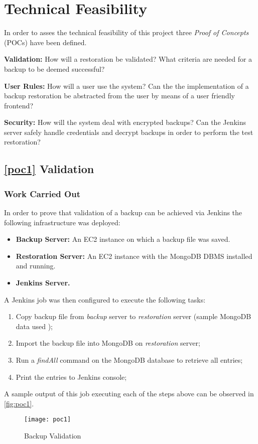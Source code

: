 
\section{Technical Feasibility}
In order to asses the technical feasibility of this project three \textit{Proof of Concepts} (POCs) have been defined.

\begin{POC}
	\item \label{poc1} \textbf{Validation:} How will a restoration be validated? What criteria are needed for a backup to be deemed successful?
	\item \label{poc2} \textbf{User Rules:} How will a user use the system? Can the the implementation of a backup restoration be abstracted from the user by means of a user friendly frontend?
	\item \label{poc3} \textbf{Security:} How will the system deal with encrypted backups? Can the Jenkins server safely handle credentials and decrypt backups in order to perform the test restoration?
\end{POC}

	\subsection{\ref{poc1} Validation}
	\subsubsection{Work Carried Out}	
	In order to prove that validation of a backup can be achieved via Jenkins the following infrastructure was deployed:
	\begin{itemize}
		\item \textbf{Backup Server:} An EC2 instance on which a backup file was saved.
		\item \textbf{Restoration Server:} An EC2 instance with the MongoDB DBMS installed and running.
		\item \textbf{Jenkins Server.}
	\end{itemize}
	A Jenkins job was then configured to execute the following tasks:
	\begin{enumerate}
		\item Copy backup file from \textit{backup} server to \textit{restoration} server (sample MongoDB data used \citep{mongo});
		\item Import the backup file into MongoDB on \textit{restoration} server;
		\item Run a \textit{findAll} command on the MongoDB database to retrieve all entries;
		\item Print the entries to Jenkins console;
	\end{enumerate}
	A sample output of this job executing each of the steps above can be observed in \autoref{fig:poc1}.
	\begin{figure}[H]
		\caption{Backup Validation}
		\centering
		\texttt{[image: poc1]}
		\label{fig:poc1}
	\end{figure}
	
